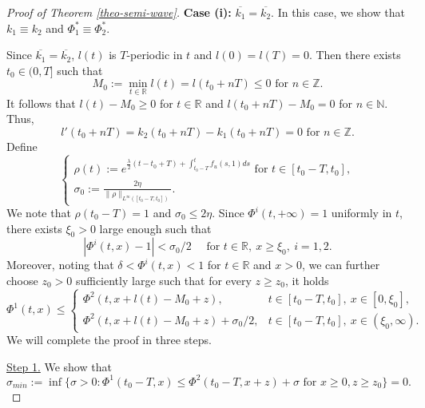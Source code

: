 \documentclass[11pt]{amsart}
\numberwithin{equation}{section}
\begin{document}
\begin{proof}[Proof of Theorem \ref{theo-semi-wave}]
\textbf{Case (i):} $\overline{k_1} =\overline{k_2}$. In this case, we show that $k_1\equiv k_2$ and $\Phi_1^*\equiv\Phi_2^*$.

Since $\overline{k_1} =\overline{k_2}$,  $l(t)$ is $T$-periodic in $t$ and $l(0)=l(T)=0$. Then there exists $t_0\in(0,T]$ such that 
\begin{equation*}
M_0:=\min_{t\in \mathbb R}l(t)=l(t_0+nT)\leq 0 \text{ for }n\in\mathbb Z.
\end{equation*}
 It follows that $ l(t)-M_0\geq 0$ for  $t\in\mathbb R$ and  $l(t_0+nT)-M_0=0$ for $n\in\mathbb N$. Thus, 
 \begin{equation}\label{eq-k12}
 l'(t_0+nT)=k_2(t_0+nT)-k_1(t_0+nT)=0 \text{ for }n\in\mathbb Z.
 \end{equation}
 Define  
 \begin{equation}\label{eq-rho}\begin{cases}
 \rho(t):=e^{\frac{\lambda }{2}(t-t_0+T)+\int_{t_0-T}^tf_u(s,1)ds} \text{ for }t\in[t_0-T,t_0],\\
  \sigma_0:=\displaystyle \frac{2\eta}{\|\rho\|_{L^\infty([t_0-T,t_0])}}.\end{cases}
 \end{equation}
 We note that $\rho(t_0-T)=1$ and $\sigma_0\leq 2\eta$.
 Since $\Phi^i(t,+\infty)=1$ uniformly in $t$, there exists $\xi_0>0$ large enough such that 
\begin{equation}\label{eq-phi-1}
|\Phi^i(t,x)-1|<\sigma_0/2 \quad \text{ for }t\in\mathbb R,~ x\geq\xi_0, ~i=1,2.
\end{equation} 
Moreover,  noting that $\delta<\Phi^i(t,x)<1$ for $t\in\mathbb R$ and $x>0$,  we can further choose $z_0>0$ sufficiently large such that   for every $ z\geq z_0$, it holds
\begin{equation}\label{eq-comp}
  \Phi^1(t,x)\leq \begin{cases}
    \Phi^2(t,x+l(t)-M_0+z), &t\in[t_0-T,t_0], ~x\in[0,\xi_0],\\
    \Phi^2(t,x+l(t)-M_0+z)+\sigma_0/2, &t\in[t_0-T,t_0],~ x\in(\xi_0,\infty).
  \end{cases}
\end{equation}
We will complete the proof in three steps.

\underline{Step 1.} We show that
\begin{equation}\label{sigmin}
  \sigma_{min}:=\inf\{\sigma>0:  \Phi^1(t_0-T,x)\leq \Phi^2(t_0-T,x+z)+\sigma \text{ for }x\geq 0, z\geq z_0\}=0.
\end{equation}


\end{proof}
\end{document}
